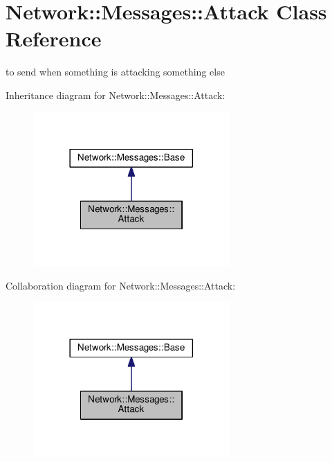 \hypertarget{class_network_1_1_messages_1_1_attack}{}\section{Network\+:\+:Messages\+:\+:Attack Class Reference}
\label{class_network_1_1_messages_1_1_attack}


to send when something is attacking something else  




Inheritance diagram for Network\+:\+:Messages\+:\+:Attack\+:
\nopagebreak
\begin{figure}[H]
\begin{center}
\leavevmode
\includegraphics[width=213pt]{class_network_1_1_messages_1_1_attack__inherit__graph}
\end{center}
\end{figure}


Collaboration diagram for Network\+:\+:Messages\+:\+:Attack\+:
\nopagebreak
\begin{figure}[H]
\begin{center}
\leavevmode
\includegraphics[width=213pt]{class_network_1_1_messages_1_1_attack__coll__graph}
\end{center}
\end{figure}
